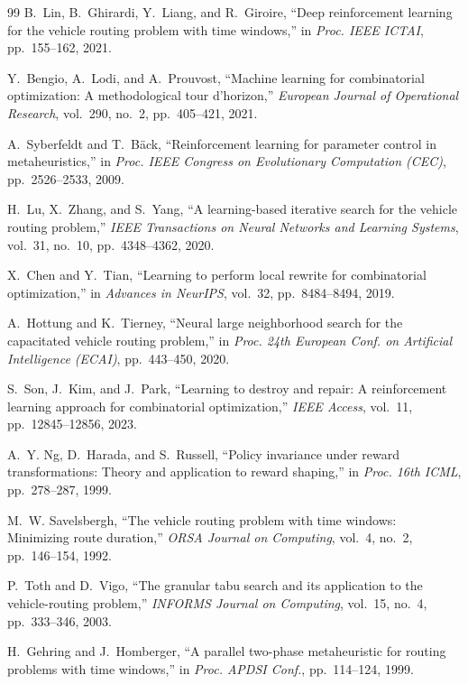\begin{thebibliography}{99}
B.~Lin, B.~Ghirardi, Y.~Liang, and R.~Giroire,
``Deep reinforcement learning for the vehicle routing problem with time windows,''
in \textit{Proc. IEEE ICTAI}, pp.~155--162, 2021.

Y.~Bengio, A.~Lodi, and A.~Prouvost,
``Machine learning for combinatorial optimization: A methodological tour d'horizon,''
\textit{European Journal of Operational Research}, vol.~290, no.~2, pp.~405--421, 2021.

A.~Syberfeldt and T.~B{\"a}ck,
``Reinforcement learning for parameter control in metaheuristics,''
in \textit{Proc. IEEE Congress on Evolutionary Computation (CEC)}, pp.~2526--2533, 2009.

H.~Lu, X.~Zhang, and S.~Yang,
``A learning-based iterative search for the vehicle routing problem,''
\textit{IEEE Transactions on Neural Networks and Learning Systems}, vol.~31, no.~10, pp.~4348--4362, 2020.

X.~Chen and Y.~Tian,
``Learning to perform local rewrite for combinatorial optimization,''
in \textit{Advances in NeurIPS}, vol.~32, pp.~8484--8494, 2019.

A.~Hottung and K.~Tierney,
``Neural large neighborhood search for the capacitated vehicle routing problem,''
in \textit{Proc. 24th European Conf. on Artificial Intelligence (ECAI)}, pp.~443--450, 2020.

S.~Son, J.~Kim, and J.~Park,
``Learning to destroy and repair: A reinforcement learning approach for combinatorial optimization,''
\textit{IEEE Access}, vol.~11, pp.~12845--12856, 2023.

A.~Y. Ng, D.~Harada, and S.~Russell,
``Policy invariance under reward transformations: Theory and application to reward shaping,''
in \textit{Proc. 16th ICML}, pp.~278--287, 1999.

M.~W. Savelsbergh,
``The vehicle routing problem with time windows: Minimizing route duration,''
\textit{ORSA Journal on Computing}, vol.~4, no.~2, pp.~146--154, 1992.

P.~Toth and D.~Vigo,
``The granular tabu search and its application to the vehicle-routing problem,''
\textit{INFORMS Journal on Computing}, vol.~15, no.~4, pp.~333--346, 2003.

H.~Gehring and J.~Homberger,
``A parallel two-phase metaheuristic for routing problems with time windows,''
in \textit{Proc. APDSI Conf.}, pp.~114--124, 1999.


\end{thebibliography}
